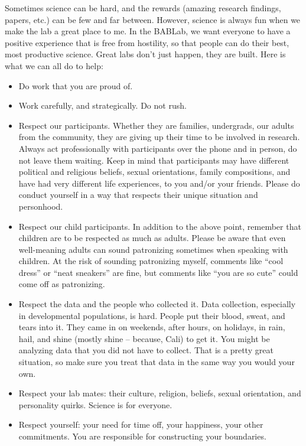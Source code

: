 \documentclass[]{book}
\providecommand{\tightlist}{%
  \setlength{\itemsep}{0pt}\setlength{\parskip}{0pt}}
\begin{document}
Sometimes science can be hard, and the rewards (amazing research findings, papers, etc.) can be few and far between. However, science is always fun when we make the lab a great place to me. In the BABLab, we want everyone to have a positive experience that is free from hostility, so that people can do their best, most productive science. Great labs don't just happen, they are built. Here is what we can all do to help:

\begin{itemize}
\tightlist
\item
  Do work that you are proud of.
\item
  Work carefully, and strategically. Do not rush.
\item
  Respect our participants. Whether they are families, undergrads, our adults from the community, they are giving up their time to be involved in research. Always act professionally with participants over the phone and in person, do not leave them waiting. Keep in mind that participants may have different political and religious beliefs, sexual orientations, family compositions, and have had very different life experiences, to you and/or your friends. Please do conduct yourself in a way that respects their unique situation and personhood.
\item
  Respect our child participants. In addition to the above point, remember that children are to be respected as much as adults. Please be aware that even well-meaning adults can sound patronizing sometimes when speaking with children. At the risk of sounding patronizing myself, comments like ``cool dress'' or ``neat sneakers'' are fine, but comments like ``you are so cute'' could come off as patronizing.
\item
  Respect the data and the people who collected it. Data collection, especially in developmental populations, is hard. People put their blood, sweat, and tears into it. They came in on weekends, after hours, on holidays, in rain, hail, and shine (mostly shine -- because, Cali) to get it. You might be analyzing data that you did not have to collect. That is a pretty great situation, so make sure you treat that data in the same way you would your own.
\item
  Respect your lab mates: their culture, religion, beliefs, sexual orientation, and personality quirks. Science is for everyone.
\item
  Respect yourself: your need for time off, your happiness, your other commitments. You are responsible for constructing your boundaries.

\end{itemize}
\end{document}
